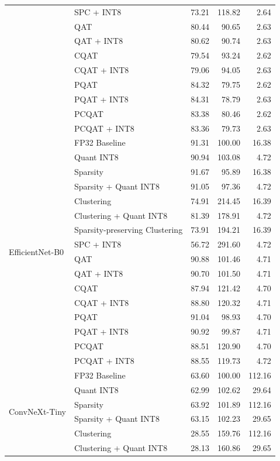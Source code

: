 \begin{table}[htbp]
{\begin{tabular}{llrrr}
  & SPC + INT8 & 73.21 & 118.82 & 2.64 \\
  & QAT & 80.44 & 90.65 & 2.63 \\
  & QAT + INT8 & 80.62 & 90.74 & 2.63 \\
  & CQAT & 79.54 & 93.24 & 2.62 \\
  & CQAT + INT8 & 79.06 & 94.05 & 2.63 \\
  & PQAT & 84.32 & 79.75 & 2.62 \\
  & PQAT + INT8 & 84.31 & 78.79 & 2.63 \\
  & PCQAT & 83.38 & 80.46 & 2.62 \\
  & PCQAT + INT8 & 83.36 & 79.73 & 2.63 \\
\midrule
\multirow{16}{*}{EfficientNet-B0}
  & FP32 Baseline & 91.31 & 100.00 & 16.38 \\
  & Quant INT8 & 90.94 & 103.08 & 4.72 \\
  & Sparsity & 91.67 & 95.89 & 16.38 \\
  & Sparsity + Quant INT8 & 91.05 & 97.36 & 4.72 \\
  & Clustering & 74.91 & 214.45 & 16.39 \\
  & Clustering + Quant INT8 & 81.39 & 178.91 & 4.72 \\
  & Sparsity-preserving Clustering & 73.91 & 194.21 & 16.39 \\
  & SPC + INT8 & 56.72 & 291.60 & 4.72 \\
  & QAT & 90.88 & 101.46 & 4.71 \\
  & QAT + INT8 & 90.70 & 101.50 & 4.71 \\
  & CQAT & 87.94 & 121.42 & 4.70 \\
  & CQAT + INT8 & 88.80 & 120.32 & 4.71 \\
  & PQAT & 91.04 & 98.93 & 4.70 \\
  & PQAT + INT8 & 90.92 & 99.87 & 4.71 \\
  & PCQAT & 88.51 & 120.90 & 4.70 \\
  & PCQAT + INT8 & 88.55 & 119.73 & 4.72 \\
\midrule
\multirow{16}{*}{ConvNeXt-Tiny}
  & FP32 Baseline & 63.60 & 100.00 & 112.16 \\
  & Quant INT8 & 62.99 & 102.62 & 29.64 \\
  & Sparsity & 63.92 & 101.89 & 112.16 \\
  & Sparsity + Quant INT8 & 63.15 & 102.23 & 29.65 \\
  & Clustering & 28.55 & 159.76 & 112.16 \\
  & Clustering + Quant INT8 & 28.13 & 160.86 & 29.65 \\

\end{tabular}}
\end{table}
